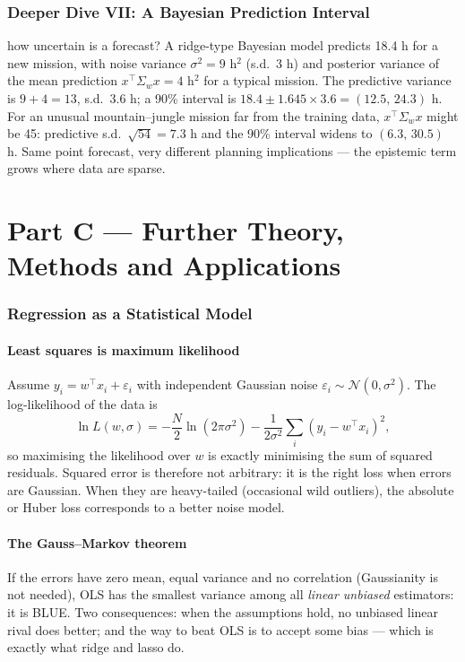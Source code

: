 \documentclass[11pt]{article}
\begin{document}
\section{Deeper Dive VII: A Bayesian Prediction Interval}
\begin{example}{how uncertain is a forecast?}
A ridge-type Bayesian model predicts 18.4 h for a new mission, with noise variance $\sigma^2=9$ h$^2$ (s.d.\ 3 h) and posterior variance of the mean prediction $x^\top\Sigma_wx=4$ h$^2$ for a typical mission. The predictive variance is $9+4=13$, s.d.\ $3.6$ h; a 90\% interval is $18.4\pm1.645\times3.6=(12.5,\,24.3)$ h. For an unusual mountain--jungle mission far from the training data, $x^\top\Sigma_wx$ might be 45: predictive s.d.\ $\sqrt{54}=7.3$ h and the 90\% interval widens to $(6.3,\,30.5)$ h. Same point forecast, very different planning implications --- the epistemic term grows where data are sparse.
\end{example}

\clearpage
\part*{Part C --- Further Theory, Methods and Applications}

\section{Regression as a Statistical Model}
\subsection{Least squares is maximum likelihood}
Assume $y_i=w^\top x_i+\varepsilon_i$ with independent Gaussian noise $\varepsilon_i\sim\mathcal N(0,\sigma^2)$. The log-likelihood of the data is
\[\ln L(w,\sigma)=-\frac N2\ln(2\pi\sigma^2)-\frac1{2\sigma^2}\sum_i(y_i-w^\top x_i)^2,\]
so maximising the likelihood over $w$ is exactly minimising the sum of squared residuals. Squared error is therefore not arbitrary: it is the right loss when errors are Gaussian. When they are heavy-tailed (occasional wild outliers), the absolute or Huber loss corresponds to a better noise model.

\subsection{The Gauss--Markov theorem}
If the errors have zero mean, equal variance and no correlation (Gaussianity is not needed), OLS has the smallest variance among all \emph{linear unbiased} estimators: it is BLUE. Two consequences: when the assumptions hold, no unbiased linear rival does better; and the way to beat OLS is to accept some bias --- which is exactly what ridge and lasso do.
\end{document}
